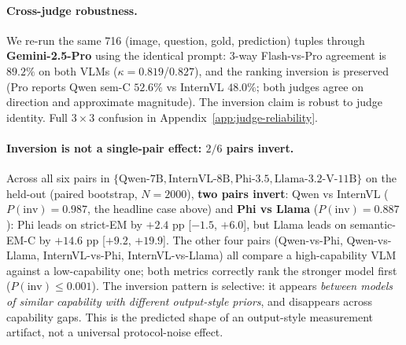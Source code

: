 \paragraph{Cross-judge robustness.}
We re-run the same 716 (image, question, gold, prediction) tuples through \textbf{Gemini-2.5-Pro} using the identical prompt: 3-way Flash-vs-Pro agreement is $89.2\%$ on both VLMs ($\kappa = 0.819$/$0.827$), and the ranking inversion is preserved (Pro reports Qwen sem-C $52.6\%$ vs InternVL $48.0\%$; both judges agree on direction and approximate magnitude). The inversion claim is robust to judge identity. Full $3\times 3$ confusion in Appendix~\ref{app:judge-reliability}.

\paragraph{Inversion is not a single-pair effect: $2/6$ pairs invert.}
Across all six pairs in $\{\text{Qwen-7B}, \text{InternVL-8B}, \text{Phi-3.5}, \text{Llama-3.2-V-11B}\}$ on the held-out (paired bootstrap, $N{=}2000$), \textbf{two pairs invert}: Qwen vs InternVL ($P(\text{inv}){=}0.987$, the headline case above) and \textbf{Phi vs Llama} ($P(\text{inv}){=}0.887$): Phi leads on strict-EM by $+2.4$ pp [$-1.5$, $+6.0$], but Llama leads on semantic-EM-C by $+14.6$ pp [$+9.2$, $+19.9$]. The other four pairs (Qwen-vs-Phi, Qwen-vs-Llama, InternVL-vs-Phi, InternVL-vs-Llama) all compare a high-capability VLM against a low-capability one; both metrics correctly rank the stronger model first ($P(\text{inv}) \leq 0.001$). The inversion pattern is selective: it appears \emph{between models of similar capability with different output-style priors}, and disappears across capability gaps. This is the predicted shape of an output-style measurement artifact, not a universal protocol-noise effect.

